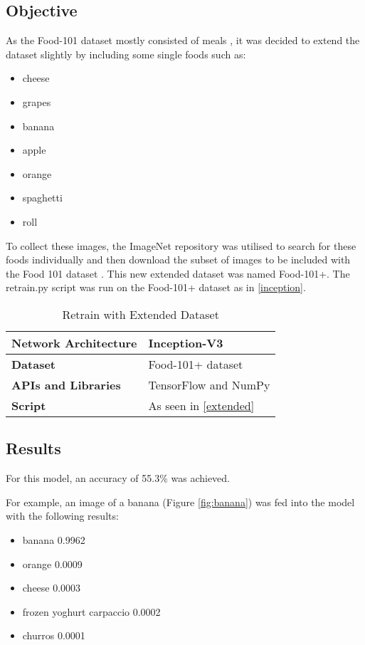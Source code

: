 \subsection*{Objective}
As the Food-101 dataset mostly consisted of meals \parencite{food101}, it was decided to extend the
dataset slightly by including some single foods such as:
\begin{itemize}
    \item{cheese}
    \item{grapes}
    \item{banana}
    \item{apple}
    \item{orange}
    \item{spaghetti}
    \item{roll}
\end{itemize}

To collect these images, the ImageNet repository was utilised to search for
these foods individually and then download the subset of images to be included
with the Food 101 dataset \parencite{imagenet}.
This new extended dataset was named Food-101+.
The retrain.py script was run on the Food-101+ dataset as in
\ref{inception}.

\begin{table}[h]
\centering
\caption{Retrain with Extended Dataset}
\label{my-label}
\begin{tabular}{|l|p{9cm}|}
\hline
\textbf{Network Architecture} & Inception-V3           \\ \hline
\textbf{Dataset}              & Food-101+ dataset \\ \hline
\textbf{APIs and Libraries}   & TensorFlow and NumPy                                                       \\ \hline
\textbf{Script}   & As seen in \ref{extended}                                                     \\ \hline

\end{tabular}
\end{table}

\subsection*{Results}
For this model, an accuracy of 55.3\% was achieved.

For example, an image of a banana (Figure \ref{fig:banana}) was fed into the model with
the following results:
\begin{itemize}
    \item{banana 0.9962}
    \item{orange 0.0009}
    \item{cheese 0.0003}
    \item{frozen yoghurt carpaccio 0.0002}
    \item{churros 0.0001}
\end{itemize}
 
